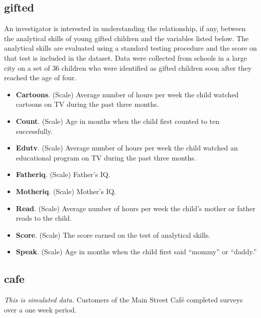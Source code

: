 \subsection{gifted}

An investigator is interested in understanding the relationship, if any, between the analytical skills of young gifted children and the variables listed below. The analytical skills are evaluated using a standard testing procedure and the score on that test is included in the dataset. Data were collected from schools in a large city on a set of $ 36 $ children who were identified as gifted children soon after they reached the age of four.

\begin{itemize}
  \item \textbf{Cartoons}. (Scale) Average number of hours per week the child watched cartoons on TV during the past three months.
  \item \textbf{Count}. (Scale) Age in months when the child first counted to ten successfully.
  \item \textbf{Edutv}. (Scale) Average number of hours per week the child watched an educational program on TV during the past three months.
  \item \textbf{Fatheriq}. (Scale) Father's IQ.
  \item \textbf{Motheriq}. (Scale) Mother's IQ.
  \item \textbf{Read}. (Scale) Average number of hours per week the child's mother or father reads to the child.
  \item \textbf{Score}. (Scale) The score earned on the test of analytical skills.
  \item \textbf{Speak}. (Scale) Age in months when the child first said ``mommy'' or ``daddy.''
\end{itemize}

\subsection{cafe}

\textit{This is simulated data.} Customers of the Main Street Caf\'{e} completed surveys over a one week period. 

